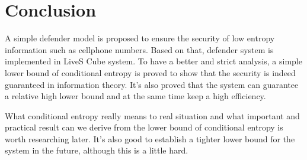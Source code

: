 \documentclass[10pt,a4paper]{article}
\begin{document}
\section{Conclusion}
	A simple defender model is proposed to ensure
	the security of low entropy information
	such as cellphone numbers. Based on that, defender system
	 is implemented in LiveS Cube
	system. To have a better and strict analysis, a simple lower bound of conditional
	entropy is proved to show that the security
	is indeed guaranteed in information theory.
	It's also proved that the system can guarantee
	a relative high lower bound and at the same time
	keep a high efficiency.
	
	What conditional entropy really means to
	real situation and what important and practical
	result can we derive from the lower bound of
	conditional entropy is worth researching later.
	It's also good to establish a tighter lower bound
	for the system in the future, although this is
	a little hard.
		
\end{document}
